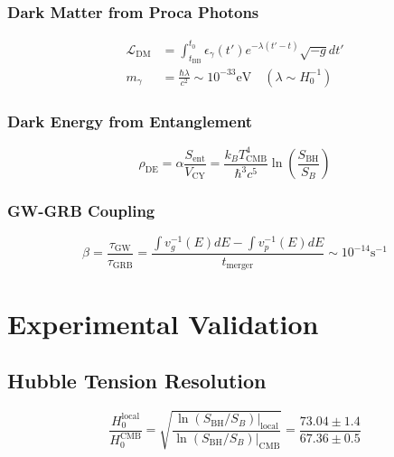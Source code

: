\documentclass[12pt, a4paper]{article}
\begin{document}
\subsubsection{Dark Matter from Proca Photons}
\begin{align}
\mathcal{L}_{\text{DM}} &= \int_{t_{\text{BB}}}^{t_0} \epsilon_\gamma(t')e^{-\lambda(t'-t)}\sqrt{-g}dt' \\
m_\gamma &= \frac{\hbar\lambda}{c^2} \sim 10^{-33}\text{eV} \quad (\lambda \sim H_0^{-1})
\end{align}

\subsubsection{Dark Energy from Entanglement}
\begin{equation}
\rho_{\text{DE}} = \alpha\frac{S_{\text{ent}}}{V_{\text{CY}}} = \frac{k_B T_{\text{CMB}}^4}{\hbar^3 c^5}\ln\left(\frac{S_{\text{BH}}}{S_B}\right)
\end{equation}

\subsubsection{GW-GRB Coupling}
\begin{equation}
\beta = \frac{\tau_{\text{GW}}}{\tau_{\text{GRB}}} = \frac{\int v_g^{-1}(E)dE - \int v_p^{-1}(E)dE}{t_{\text{merger}}} \sim 10^{-14}\text{s}^{-1}
\end{equation}

\section{Experimental Validation}

\subsection{Hubble Tension Resolution}
\begin{equation}
\frac{H_0^{\text{local}}}{H_0^{\text{CMB}}} = \sqrt{\frac{\ln(S_{\text{BH}}/S_B)|_{\text{local}}}{\ln(S_{\text{BH}}/S_B)|_{\text{CMB}}}} = \frac{73.04 \pm 1.4}{67.36 \pm 0.5}
\end{equation}
\end{document}
